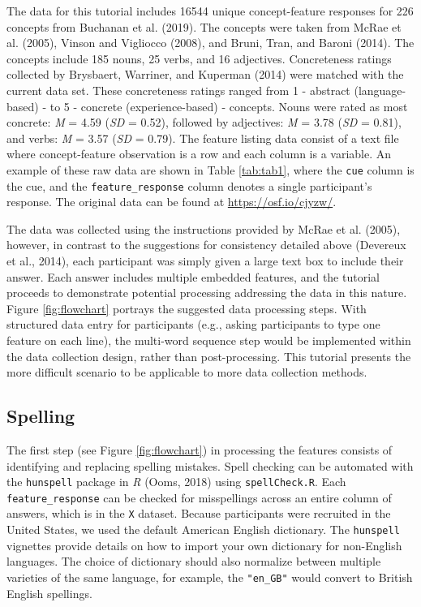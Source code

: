 \documentclass[man]{apa6}
\begin{document}
The data for this tutorial includes 16544 unique concept-feature responses for 226 concepts from Buchanan et al. (2019). The concepts were taken from McRae et al. (2005), Vinson and Vigliocco (2008), and Bruni, Tran, and Baroni (2014). The concepts include 185 nouns, 25 verbs, and 16 adjectives. Concreteness ratings collected by Brysbaert, Warriner, and Kuperman (2014) were matched with the current data set. These concreteness ratings ranged from 1 - abstract (language-based) - to 5 - concrete (experience-based) - concepts. Nouns were rated as most concrete: \emph{M} = 4.59 (\emph{SD} = 0.52), followed by adjectives: \emph{M} = 3.78 (\emph{SD} = 0.81), and verbs: \emph{M} = 3.57 (\emph{SD} = 0.79). The feature listing data consist of a text file where concept-feature observation is a row and each column is a variable. An example of these raw data are shown in Table \ref{tab:tab1}, where the \texttt{cue} column is the cue, and the \texttt{feature\_response} column denotes a single participant's response. The original data can be found at \url{https://osf.io/cjyzw/}.

The data was collected using the instructions provided by McRae et al. (2005), however, in contrast to the suggestions for consistency detailed above (Devereux et al., 2014), each participant was simply given a large text box to include their answer. Each answer includes multiple embedded features, and the tutorial proceeds to demonstrate potential processing addressing the data in this nature. Figure \ref{fig:flowchart} portrays the suggested data processing steps. With structured data entry for participants (e.g., asking participants to type one feature on each line), the multi-word sequence step would be implemented within the data collection design, rather than post-processing. This tutorial presents the more difficult scenario to be applicable to more data collection methods.

\hypertarget{spelling}{%
\subsection{Spelling}\label{spelling}}

The first step (see Figure \ref{fig:flowchart}) in processing the features consists of identifying and replacing spelling mistakes. Spell checking can be automated with the \texttt{hunspell} package in \emph{R} (Ooms, 2018) using \texttt{spellCheck.R}. Each \texttt{feature\_response} can be checked for misspellings across an entire column of answers, which is in the \texttt{X} dataset. Because participants were recruited in the United States, we used the default American English dictionary. The \texttt{hunspell} vignettes provide details on how to import your own dictionary for non-English languages. The choice of dictionary should also normalize between multiple varieties of the same language, for example, the \texttt{"en\_GB"} would convert to British English spellings.
\end{document}
